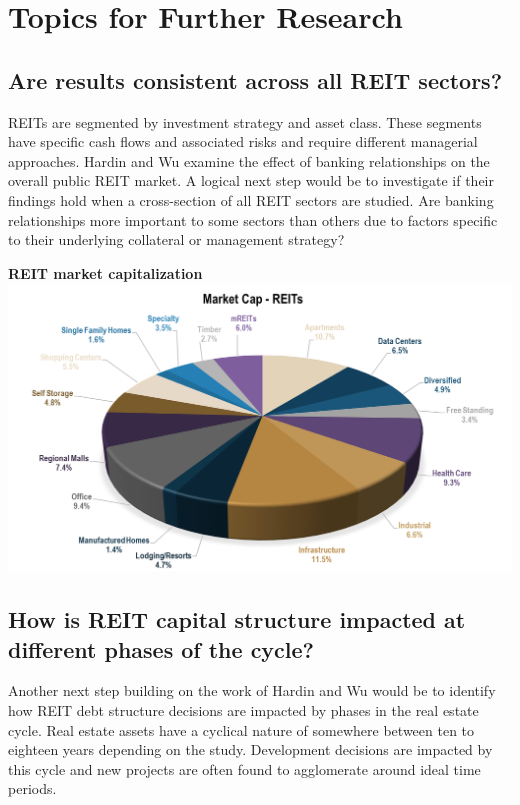 \documentclass[a4paper, 12pt]{article} %
\begin{document}

\section*{Topics for Further Research}
\subsection*{Are results consistent across all REIT sectors?}
REITs are segmented by investment strategy and asset class. These segments have specific cash flows and associated risks and require different managerial approaches. Hardin and Wu examine the effect of banking relationships on the overall public REIT market. A logical next step would be to investigate if their findings hold when a cross-section of all REIT sectors are studied. Are banking relationships more important to some sectors than others due to factors specific to their underlying collateral or management strategy?

\begin{center}
\textbf{REIT market capitalization}
\includegraphics[width=1\textwidth]{REIT.png}

\end{center}


\subsection*{How is REIT capital structure impacted at different phases of the cycle?}


Another next step building on the work of Hardin and Wu would be to identify how REIT debt structure decisions are impacted by phases in the real estate cycle. Real estate assets have a cyclical nature of somewhere between ten to eighteen years depending on the study. Development decisions are impacted by this cycle and new projects are often found to agglomerate around ideal time periods.
\end{document}
